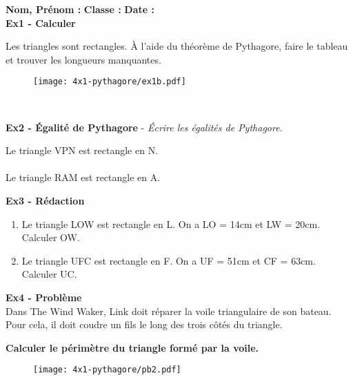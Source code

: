 


\textbf{Nom, Prénom :} \hspace{8cm} \textbf{Classe :} \hspace{3cm} \textbf{Date :}\\

\textbf{Ex1 - Calculer}

Les triangles sont rectangles. À l'aide du théorème de Pythagore, faire le tableau et trouver les longueurs manquantes. 

\begin{multicols}{3}

\begin{figure}[H]
  \centering
  \texttt{[image: 4x1-pythagore/ex1b.pdf]}
\end{figure} \columnbreak

\Pointilles[8] \columnbreak \\
\Pointilles[8]

\end{multicols}

\textbf{Ex2 - Égalité de Pythagore} - \textit{Écrire les égalités de Pythagore.}

\begin{multicols}{2}
Le triangle VPN est rectangle en N. \\ \Pointilles[1] \\
Le triangle RAM est rectangle en A. \\ \Pointilles[1] 
\end{multicols}

\textbf{Ex3 - Rédaction}

\begin{multicols}{2} \begin{enumerate}
  \item Le triangle LOW est rectangle en L. On a LO = 14cm et LW = 20cm. Calculer OW. \\ \Pointilles[7] \columnbreak
  \item Le triangle UFC est rectangle en F. On a UF = 51cm et CF = 63cm. Calculer UC. \\ \Pointilles[7]
\end{enumerate} \end{multicols} 

\begin{multicols}{2} 

\textbf{Ex4 - Problème} \\

Dans The Wind Waker, Link doit réparer la voile triangulaire de son bateau. Pour cela, il doit coudre un fils le long des trois côtés du triangle. 

\textbf{Calculer le périmètre du triangle formé par la voile.} 

\Pointilles[13] \columnbreak

\begin{figure}[H]
  \centering
  \texttt{[image: 4x1-pythagore/pb2.pdf]}
\end{figure}

\end{multicols}

